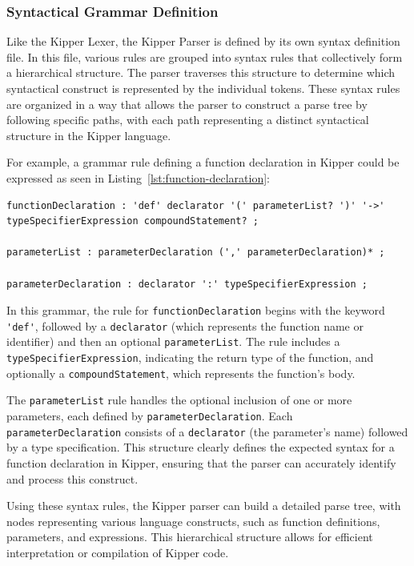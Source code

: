 \subsubsection{Syntactical Grammar Definition}
\label{sec:parser-grammar-definition}

Like the Kipper Lexer, the Kipper Parser is defined by its own syntax definition file. In this file, various rules are grouped into syntax rules that collectively form a hierarchical structure. The parser traverses this structure to determine which syntactical construct is represented by the individual tokens. These syntax rules are organized in a way that allows the parser to construct a parse tree by following specific paths, with each path representing a distinct syntactical structure in the Kipper language.

For example, a grammar rule defining a function declaration in Kipper could be expressed as seen in Listing~\ref{lst:function-declaration}:

\begin{lstlisting}[float,language=antlr4, caption={Function Declaration Grammar}, label={lst:function-declaration}]
functionDeclaration : 'def' declarator '(' parameterList? ')' '->' typeSpecifierExpression compoundStatement? ;

parameterList : parameterDeclaration (',' parameterDeclaration)* ;

parameterDeclaration : declarator ':' typeSpecifierExpression ;
\end{lstlisting}

In this grammar, the rule for \lstinline|functionDeclaration| begins with the keyword \lstinline|'def'|, followed by a \lstinline|declarator| (which represents the function name or identifier) and then an optional \lstinline|parameterList|. The rule includes a \lstinline|typeSpecifierExpression|, indicating the return type of the function, and optionally a \lstinline|compoundStatement|, which represents the function's body.

The \lstinline|parameterList| rule handles the optional inclusion of one or more parameters, each defined by \lstinline|parameterDeclaration|. Each \lstinline|parameterDeclaration| consists of a \lstinline|declarator| (the parameter's name) followed by a type specification. This structure clearly defines the expected syntax for a function declaration in Kipper, ensuring that the parser can accurately identify and process this construct.

Using these syntax rules, the Kipper parser can build a detailed parse tree, with nodes representing various language constructs, such as function definitions, parameters, and expressions. This hierarchical structure allows for efficient interpretation or compilation of Kipper code.

